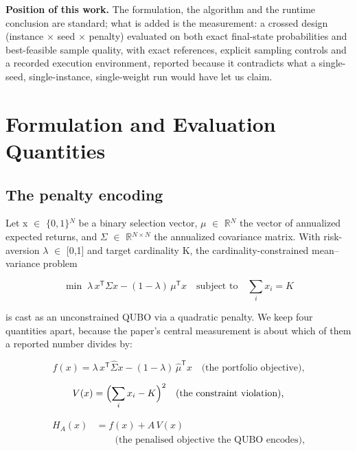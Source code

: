 \documentclass{ieeeaccess}
\begin{document}
\textbf{Position of this work.} The formulation, the algorithm and the runtime conclusion are standard; what is added is the measurement: a crossed design (instance $\times$ seed $\times$ penalty) evaluated on both exact final-state probabilities and best-feasible sample quality, with exact references, explicit sampling controls and a recorded execution environment, reported because it contradicts what a single-seed, single-instance, single-weight run would have let us claim.


\section{Formulation and Evaluation Quantities}


\subsection{The penalty encoding}


Let x $\in$ $\{0,1\}$$^{N}$ be a binary selection vector, $\mu$ $\in$ $\mathbb{R}$$^{N}$ the vector of annualized expected returns, and $\Sigma$ $\in$ $\mathbb{R}$$^{N\times N}$ the annualized covariance matrix. With risk-aversion $\lambda$ $\in$ [0,1] and target cardinality K, the cardinality-constrained mean--variance problem


\begin{equation*}
\min\; \lambda\, x^{\mathsf{T}}\Sigma x - (1-\lambda)\, \mu^{\mathsf{T}}x\quad \text{subject to}\quad \sum_i x_i = K
\end{equation*}


is cast as an unconstrained QUBO via a quadratic penalty. We keep four quantities apart, because the paper's central measurement is about which of them a reported number divides by:


\begin{equation*}
f(x) = \lambda\, x^{\mathsf{T}}\hat{\Sigma} x - (1-\lambda)\, \hat{\mu}^{\mathsf{T}}x\quad\text{(the portfolio objective),}
\end{equation*}


\begin{equation*}
V(x) = \Bigl(\sum_i x_i - K\Bigr)^2\quad\text{(the constraint violation),}
\end{equation*}


\begin{equation*}
\begin{aligned} H_A(x) &= f(x) + A\, V(x) \\ &\qquad\text{(the penalised objective the QUBO encodes),}\end{aligned}
\end{equation*}
\end{document}
